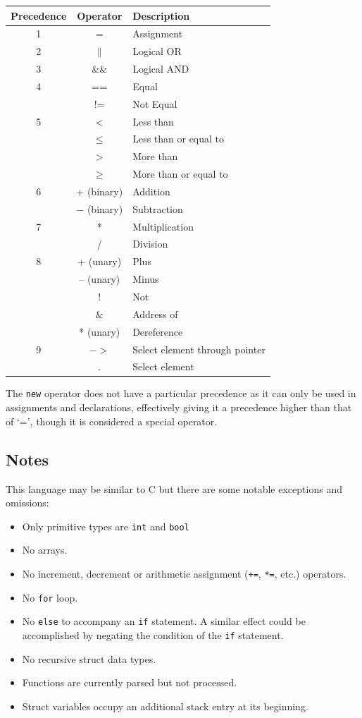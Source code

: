 \documentclass[a4paper,11pt]{article}
\begin{document}
\begin{tabular}{| c | c | l |}
\hline
Precedence & Operator & Description \\ \hline
1 & = & Assignment \\ \hline
2 & $\parallel$ & Logical OR \\ \hline
3 & \&\& & Logical AND \\ \hline
4 & == & Equal \\
  & != & Not Equal \\ \hline
5 & $<$ & Less than \\
  & $\leq$ & Less than or equal to \\
  & $>$ & More than \\
  & $\geq$ & More than or equal to \\ \hline
6 & + (binary) & Addition \\
  & $-$ (binary) & Subtraction \\ \hline
7 & * & Multiplication \\
  & / & Division \\ \hline
8 & + (unary) & Plus \\
  & -- (unary) & Minus \\
  & ! & Not \\
  & $\&$ & Address of \\
  & * (unary) & Dereference \\ \hline
9 & $-$$>$ & Select element through pointer \\
  & . & Select element \\ \hline
\end{tabular}

The \verb+new+ operator does not have a particular precedence as it can only be used in assignments and declarations, effectively giving it a precedence higher than that of `=', though it is considered a special operator.

\subsection{Notes}

This language may be similar to C but there are some notable exceptions and omissions:
\begin{itemize}
 \item Only primitive types are \verb+int+ and \verb+bool+
 \item No arrays.
 \item No increment, decrement or arithmetic assignment (\verb/+=/, \verb+*=+, etc.) operators.
 \item No \verb+for+ loop.
 \item No \verb+else+ to accompany an \verb+if+ statement. A similar effect could be accomplished by negating the condition of the \verb+if+ statement.
 \item No recursive struct data types.
 \item Functions are currently parsed but not processed.
 \item Struct variables occupy an additional stack entry at its beginning.
\end{itemize}
\end{document}
